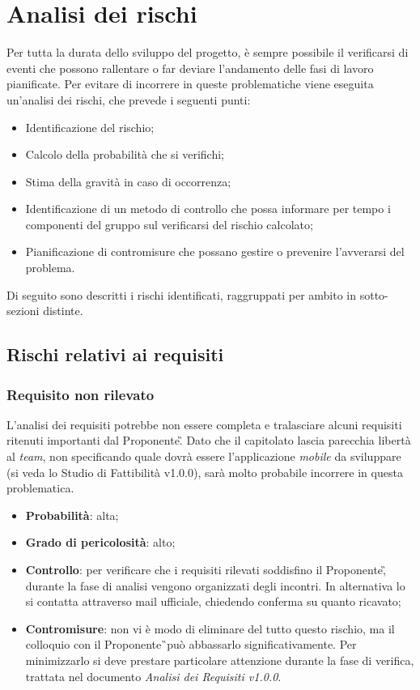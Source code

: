 \section{Analisi dei rischi}
Per tutta la durata dello sviluppo del progetto, è sempre possibile il verificarsi di eventi che possono rallentare o far deviare l'andamento delle fasi di lavoro pianificate. Per evitare di incorrere in queste problematiche viene eseguita un'analisi dei rischi, che prevede i seguenti punti:
\begin{itemize}
\item Identificazione del rischio;
\item Calcolo della probabilità che si verifichi;
\item Stima della gravità in caso di occorrenza;
\item Identificazione di un metodo di controllo che possa informare per tempo i componenti del gruppo sul verificarsi del rischio calcolato;
\item Pianificazione di contromisure che possano gestire o prevenire l'avverarsi del problema.
\end{itemize}
Di seguito sono descritti i rischi identificati, raggruppati per ambito in sotto-sezioni distinte.

\subsection{Rischi relativi ai requisiti}

\subsubsection{Requisito non rilevato}
\label{sec:ReqNonRil}
L'analisi dei requisiti potrebbe non essere completa e tralasciare alcuni requisiti ritenuti importanti dal Proponente\G. Dato che il capitolato lascia parecchia libertà al \textit{team}, non specificando quale dovrà essere l'applicazione \textit{mobile} da sviluppare (si veda lo Studio di Fattibilità v1.0.0), sarà molto probabile incorrere in questa problematica. 
\begin{itemize}
\item \textbf{Probabilità}: alta;
\item \textbf{Grado di pericolosità}: alto;
\item \textbf{Controllo}: per verificare che i requisiti rilevati soddisfino il Proponente\G, durante la fase di analisi vengono organizzati degli incontri. In alternativa lo si contatta attraverso mail ufficiale, chiedendo conferma su quanto ricavato;
\item \textbf{Contromisure}: non vi è modo di eliminare del tutto questo rischio, ma il colloquio con il Proponente\G\ può abbassarlo significativamente. Per minimizzarlo si deve prestare particolare attenzione durante la fase di verifica, trattata nel documento \textit{Analisi dei Requisiti v1.0.0}.
\end{itemize}

